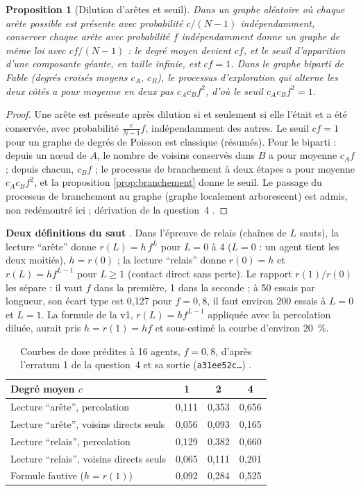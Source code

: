 \documentclass[11pt,a4paper]{article}
\theoremstyle{definition}
\theoremstyle{plain}
\newtheorem{proposition}[definition]{Proposition}
\begin{document}
\begin{proposition}[Dilution d'arêtes et seuil]
\label{prop:dilution}
Dans un graphe aléatoire où chaque arête possible est présente avec probabilité $c/(N-1)$
indépendamment, conserver chaque arête avec probabilité $f$ indépendamment donne un graphe de même
loi avec $cf/(N-1)$ : le degré moyen devient $cf$, et le seuil d'apparition d'une composante géante,
en taille infinie, est $cf=1$. Dans le graphe biparti de Fable (degrés croisés moyens $c_A$, $c_B$),
le processus d'exploration qui alterne les deux côtés a pour moyenne en deux pas $c_Ac_Bf^2$, d'où le
seuil $c_Ac_Bf^2=1$.
\end{proposition}
\begin{proof}
Une arête est présente après dilution si et seulement si elle l'était et a été conservée, avec
probabilité $\frac{c}{N-1}f$, indépendamment des autres. Le seuil $cf=1$ pour un graphe de degrés de
Poisson est classique \cite{molloyreed1995,newman2001pre} (résumés). Pour le biparti : depuis un
nœud de $A$, le nombre de voisins conservés dans $B$ a pour moyenne $c_Af$ ; depuis chacun, $c_Bf$ ;
le processus de branchement à deux étapes a pour moyenne $c_Ac_Bf^2$, et la proposition
\ref{prop:branchement} donne le seuil. Le passage du processus de branchement au graphe (graphe
localement arborescent) est admis, non redémontré ici ; dérivation de la question~4
\cite[section~4]{q4}.
\end{proof}

\textbf{Deux définitions du saut} \cite{erratumq4}. Dans l'épreuve de relais (chaînes de $L$
sauts), la lecture \enquote{arête} donne $r(L)=h\,f^L$ pour $L=0$ à 4 ($L=0$ : un agent tient les deux
moitiés), $h=r(0)$ ; la lecture \enquote{relais} donne $r(0)=h$ et $r(L)=hf^{L-1}$ pour $L\ge1$ (contact
direct sans perte). Le rapport $r(1)/r(0)$ les sépare : il vaut $f$ dans la première, 1 dans la
seconde ; à 50 essais par longueur, son écart type est 0,127 pour $f=0{,}8$, il faut environ 200 essais
à $L=0$ et $L=1$. La formule de la v1, $r(L)=hf^{L-1}$ appliquée avec la percolation diluée, aurait
pris $h=r(1)=hf$ et sous-estimé la courbe d'environ 20~\%.

\begin{table}[ht]
\centering\small
\caption{Courbes de dose prédites à 16 agents, $f=0{,}8$, d'après l'erratum 1 de la question~4 et
sa sortie (\texttt{a31ee52c…}) \cite{erratumq4}.}
\label{tab:dose}
\begin{tabular}{@{}lccc@{}}
\toprule
Degré moyen $c$ & 1 & 2 & 4 \\
\midrule
Lecture \enquote{arête}, percolation & 0,111 & 0,353 & 0,656 \\
Lecture \enquote{arête}, voisins directs seuls & 0,056 & 0,093 & 0,165 \\
Lecture \enquote{relais}, percolation & 0,129 & 0,382 & 0,660 \\
Lecture \enquote{relais}, voisins directs seuls & 0,065 & 0,111 & 0,201 \\
Formule fautive ($h=r(1)$) & 0,092 & 0,284 & 0,525 \\
\bottomrule
\end{tabular}
\end{table}
\end{document}
